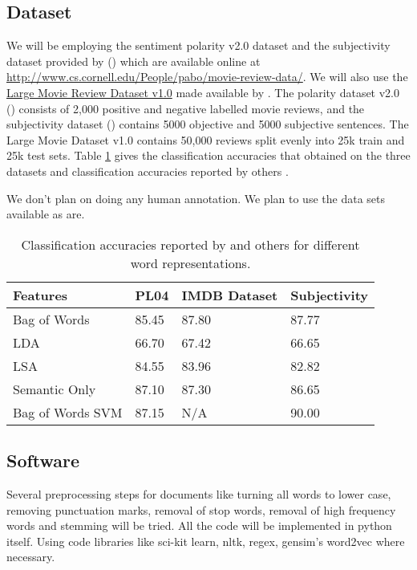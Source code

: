 \documentclass[11pt, oneside]{article}   	%
\begin{document}
\subsection*{Dataset}
We will be employing the sentiment polarity v2.0 dataset and the subjectivity dataset provided by (\cite{pang2004sentimental}) which are available online at \url{http://www.cs.cornell.edu/People/pabo/movie-review-data/}. We will also use the \href{http://ai.stanford.edu/~amaas/data/sentiment/}{Large Movie Review Dataset v1.0} made available by \cite{maas2011learning}. The polarity dataset v2.0 (\cite{pang2004sentimental}) consists of 2,000 positive and negative labelled movie reviews, and the subjectivity dataset (\cite{pang2004sentimental}) contains 5000 objective and 5000 subjective sentences. The Large Movie Dataset v1.0 \cite{maas2011learning}contains 50,000 reviews split evenly into 25k train and 25k test sets. Table \ref{table:1} gives the classification accuracies that \cite{maas2011learning} obtained on the three datasets and classification accuracies reported by others \cite{sadeghianbag}.

We don't plan on doing any human annotation. We plan to use the data sets available as are.

\begin{table}[H]
\begin{tabular}{ | l | p{1.5cm} | p{3cm} | p{3cm} |  }
 \hline
 \textbf{Features} & \textbf{PL04} & \textbf{IMDB Dataset} & \textbf{Subjectivity} \\
 \hline
 Bag of Words   & 85.45 & 87.80 & 87.77 \\
 LDA & 66.70 & 67.42 & 66.65 \\
 LSA & 84.55 & 83.96 & 82.82 \\
 Semantic Only & 87.10 & 87.30 & 86.65 \\
 Bag of Words SVM \cite{pang2004sentimental} & 87.15 & N/A & 90.00 \\
 \hline
\end{tabular}
\caption{Classification accuracies reported by \cite{maas2011learning} and others for different word representations.}
\label{table:1}
\end{table}

\subsection*{Software}
Several preprocessing steps for documents like turning all words to lower case, removing punctuation marks, removal of stop words, removal of high frequency words and stemming will be tried. All the code will be implemented in python itself. Using code libraries like sci-kit learn, nltk, regex, gensim’s word2vec where necessary.


\end{document}
